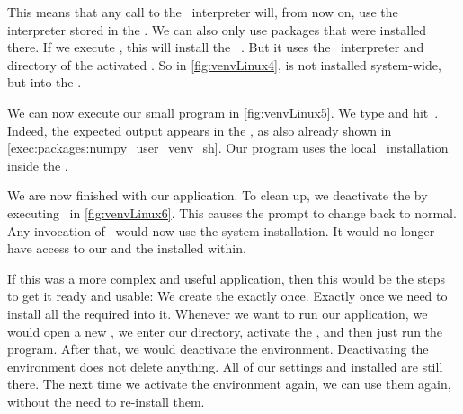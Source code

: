 This means that any call to the \python\ interpreter will, from now on, use the interpreter stored in the .
We can also only use packages that were installed there.
If we execute , this will install the \numpy\ .
But it uses the \python\ interpreter and  directory of the activated .
So in \cref{fig:venvLinux4}, \numpy{} is not installed system-wide, but into the .%
%
\begin{sloppypar}%
We can now execute our small program  in \cref{fig:venvLinux5}.
We type  and hit~\keys{\return}.
Indeed, the expected output  appears in the , as also already shown in \cref{exec:packages:numpy_user_venv_sh}.
Our program uses the local \numpy\ installation inside the .%
\end{sloppypar}%
%
We are now finished with our application.
To clean up, we deactivate the  by executing~ in \cref{fig:venvLinux6}.
This causes the prompt to change back to normal.
Any invocation of \python\ would now use the system installation.
It would no longer have access to our  and the  installed within.

If this was a more complex and useful application, then this would be the steps to get it ready and usable:
We create the  exactly once.
Exactly once we need to install all the required  into it.
Whenever we want to run our application, we would open a new , we enter our directory, activate the , and then just run the program.
After that, we would deactivate the environment.
Deactivating the environment does not delete anything.
All of our settings and installed  are still there.
The next time we activate the environment again, we can use them again, without the need to re-install them.

